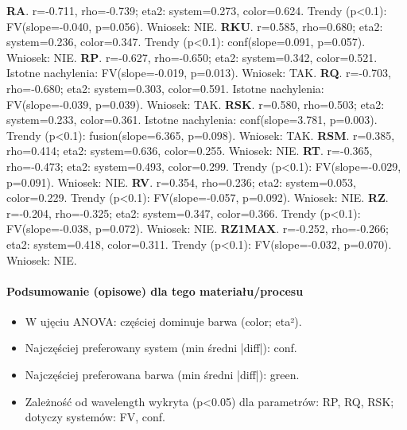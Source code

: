 \documentclass[
  10pt,
]{article}
\begin{document}
\textbf{RA}. r=-0.711, rho=-0.739; eta2: system=0.273, color=0.624.
Trendy (p\textless0.1): FV(slope=-0.040, p=0.056). Wniosek: NIE.
\textbf{RKU}. r=0.585, rho=0.680; eta2: system=0.236, color=0.347.
Trendy (p\textless0.1): conf(slope=0.091, p=0.057). Wniosek: NIE.
\textbf{RP}. r=-0.627, rho=-0.650; eta2: system=0.342, color=0.521.
Istotne nachylenia: FV(slope=-0.019, p=0.013). Wniosek: TAK.
\textbf{RQ}. r=-0.703, rho=-0.680; eta2: system=0.303, color=0.591.
Istotne nachylenia: FV(slope=-0.039, p=0.039). Wniosek: TAK.
\textbf{RSK}. r=0.580, rho=0.503; eta2: system=0.233, color=0.361.
Istotne nachylenia: conf(slope=3.781, p=0.003). Trendy (p\textless0.1):
fusion(slope=6.365, p=0.098). Wniosek: TAK. \textbf{RSM}. r=0.385,
rho=0.414; eta2: system=0.636, color=0.255. Wniosek: NIE. \textbf{RT}.
r=-0.365, rho=-0.473; eta2: system=0.493, color=0.299. Trendy
(p\textless0.1): FV(slope=-0.029, p=0.091). Wniosek: NIE. \textbf{RV}.
r=0.354, rho=0.236; eta2: system=0.053, color=0.229. Trendy
(p\textless0.1): FV(slope=-0.057, p=0.092). Wniosek: NIE. \textbf{RZ}.
r=-0.204, rho=-0.325; eta2: system=0.347, color=0.366. Trendy
(p\textless0.1): FV(slope=-0.038, p=0.072). Wniosek: NIE.
\textbf{RZ1MAX}. r=-0.252, rho=-0.266; eta2: system=0.418, color=0.311.
Trendy (p\textless0.1): FV(slope=-0.032, p=0.070). Wniosek: NIE.

\paragraph{Podsumowanie (opisowe) dla tego materiału/procesu}
\begin{itemize}
\item W ujęciu ANOVA: częściej dominuje barwa (color; eta²).
\item Najczęściej preferowany system (min średni |diff|): conf.
\item Najczęściej preferowana barwa (min średni |diff|): green.
\item Zależność od wavelength wykryta (p<0.05) dla parametrów: RP, RQ, RSK; dotyczy systemów: FV, conf.
\end{itemize}
\end{document}
